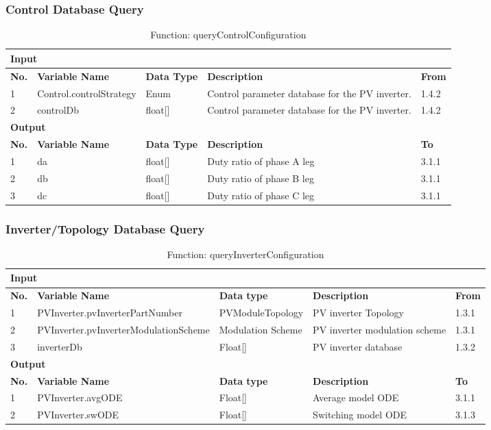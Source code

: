\documentclass{article}
\begin{document}
\subsubsection{Control Database Query}
\begin{table}[h]
\centering
\caption{Function: queryControlConfiguration}
\begin{tabular}{|l|l|l|p{5cm}|p{3cm}|}
\hline
\multicolumn{5}{|l|}{\textbf{Input}} \\ \hline
\textbf{No.} & \textbf{Variable Name} & \textbf{Data Type} & \textbf{Description} & \textbf{From} \\ \hline
1 & Control.controlStrategy & Enum & Control parameter database for the PV inverter. & 1.4.2 \\ \hline
2 & controlDb & float[] & Control parameter database for the PV inverter. & 1.4.2 \\ \hline
\multicolumn{5}{|l|}{\textbf{Output}} \\ \hline
\textbf{No.} & \textbf{Variable Name} & \textbf{Data Type} & \textbf{Description} & \textbf{To} \\ \hline
1 & da & float[] & Duty ratio of phase A leg & 3.1.1 \\ \hline
2 & db & float[] & Duty ratio of phase B leg & 3.1.1 \\ \hline
3 & dc & float[] & Duty ratio of phase C leg & 3.1.1 \\ \hline
\end{tabular}
\end{table}

\subsubsection{Inverter/Topology Database Query}
\begin{table}[h]
\centering
\caption{Function: queryInverterConfiguration}
\begin{tabular}{|l|p{4cm}|p{2cm}|p{5cm}|p{2cm}|}
\hline
\multicolumn{5}{|l|}{\textbf{Input}} \\ \hline
\textbf{No.} & \textbf{Variable Name} & \textbf{Data type} & \textbf{Description} & \textbf{From} \\ \hline
1 & PVInverter.pvInverterPartNumber & PVModuleTopology & PV inverter Topology & 1.3.1 \\ \hline
2 & PVInverter.pvInverterModulationScheme & Modulation Scheme & PV inverter modulation scheme & 1.3.1 \\ \hline
3 & inverterDb & Float[] & PV inverter database & 1.3.2 \\ \hline
\multicolumn{5}{|l|}{\textbf{Output}} \\ \hline
\textbf{No.} & \textbf{Variable Name} & \textbf{Data type} & \textbf{Description} & \textbf{To} \\ \hline
1 & PVInverter.avgODE & Float[] & Average model ODE & 3.1.1 \\ \hline
2 & PVInverter.swODE & Float[] & Switching model ODE & 3.1.3 \\ \hline
\end{tabular}
\end{table}
\end{document}
